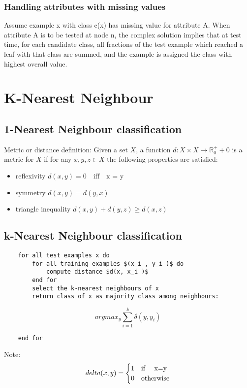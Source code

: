 \documentclass[a4paper, 10pt, titlepage]{article}
\begin{document}
\subsubsection{Handling attributes with missing values}
Assume example x with class c(x) has missing value for attribute A.
When attribute A is to be tested at node n, the complex solution implies that at test time, for each candidate class, all fractions of the test example which reached a leaf with that class are summed, and the example is assigned the class with highest overall value.

\newpage

\section{K-Nearest Neighbour}
\subsection{1-Nearest Neighbour classification}
Metric or distance definition:
Given a set $X$, a function $d : X \times X \rightarrow \mathbb{R}_{0}^{+} + 0$ is a metric for $X$ if for any $x, y, z \in X$ the following properties are
satisfied:
\begin{itemize}
\item reflexivity $d(x, y) = 0 \quad \text{iff} \quad \text{x = y}$
\item symmetry $d(x, y) = d(y, x)$
\item triangle inequality $d(x, y) + d(y, z) \geq d(x, z)$
\end{itemize}

\subsection{k-Nearest Neighbour classification}
\begin{lstlisting}
	for all test examples x do
		for all training examples $(x_i , y_i )$ do
			compute distance $d(x, x_i )$	
		end for
		select the k-nearest neighbours of x
		return class of x as majority class among neighbours:
\end{lstlisting}
$$argmax_y \sum_{i=1}^{k}\delta(y,y_i)$$
\begin{lstlisting}
	end for
\end{lstlisting}
Note:
\begin{equation}
delta(x,y) =  \begin{cases}
      1 & \text{if \quad x=y}\\
      0 & \text{otherwise}
    \end{cases}   
\end{equation}
\end{document}
